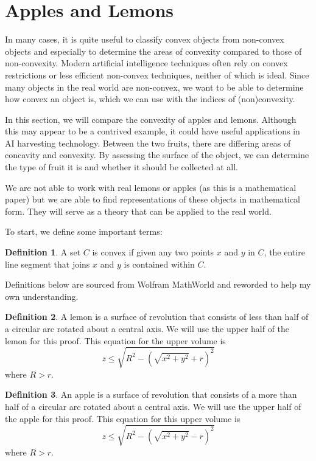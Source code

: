 \documentclass[12pt]{article}
\numberwithin{equation}{section}
\numberwithin{figure}{section}
\numberwithin{table}{section}
\theoremstyle{definition}
\newtheorem{definition}{Definition}[section]
\theoremstyle{remark}
\numberwithin{equation}{section}
\begin{document}
\section{Apples and Lemons}
\label{appleslemons}

In many cases, it is quite useful to classify convex objects from non-convex objects and especially to determine the areas of convexity compared to those of non-convexity. Modern artificial intelligence techniques often rely on convex restrictions or less efficient non-convex techniques, neither of which is ideal. \citep{JK2017} Since many objects in the real world are non-convex, we want to be able to determine how convex an object is, which we can use with the indices of (non)convexity. 

In this section, we will compare the convexity of apples and lemons. Although this may appear to be a contrived example, it could have useful applications in AI harvesting technology. Between the two fruits, there are differing areas of concavity and convexity. By assessing the surface of the object, we can determine the type of fruit it is and whether it should be collected at all.

We are not able to work with real lemons or apples (as this is a mathematical paper) but we are able to find representations of these objects in mathematical form. They will serve as a theory that can be applied to the real world.

To start, we define some important terms:
\begin{definition}
	A set $C$ is convex if given any two points $x$ and $y$ in $C$, the entire line segment that joins $x$ and $y$ is contained within $C$. 
\end{definition}
Definitions below are sourced from Wolfram MathWorld and reworded to help my own understanding. 
\begin{definition}
	A lemon is a surface of revolution that consists of less than half of a circular arc rotated about a central axis. We will use the upper half of the lemon for this proof. This equation for the upper volume is
\[
z \leq \sqrt{R^{2} - (\sqrt{x^{2} + y^{2}} + r)^{2}}
\]
where $R > r$.
\end{definition}
\begin{definition}
	An apple is a surface of revolution that consists of a more than half of a circular arc rotated about a central axis. We will use the upper half of the apple for this proof. This equation for this upper volume is
\[
z \leq \sqrt{R^{2} - (\sqrt{x^{2} + y^{2}} - r)^{2}}
\]
where $R > r$.
\end{definition}
\end{document}
